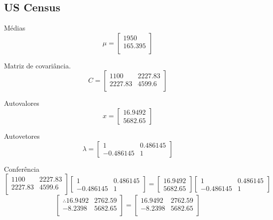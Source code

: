 \documentclass[a4paper, 11pt]{article}
\begin{document}
\subsection*{US Census}
Médias
$$ \mu =
\begin{bmatrix}
1950 \\
165.395\\
\end{bmatrix}
$$

Matriz de covariância.
$$ C =
\begin{bmatrix}
1100&2227.83\\
2227.83&4599.6\\
\end{bmatrix}
$$

Autovalores
$$ x =
\begin{bmatrix}
16.9492\\
5682.65
\end{bmatrix}
$$

Autovetores
$$ \lambda =
\begin{bmatrix}
1&0.486145\\
-0.486145&1
\end{bmatrix}
$$

Conferência
$$
\begin{bmatrix}
1100&2227.83\\
2227.83&4599.6\\
\end{bmatrix}
\begin{bmatrix}
1&0.486145\\
-0.486145&1
\end{bmatrix}
=
\begin{bmatrix}
16.9492\\
5682.65
\end{bmatrix}
\begin{bmatrix}
1&0.486145\\
-0.486145&1
\end{bmatrix}
$$
$$
\begin{bmatrix}
\therefore
16.9492&2762.59\\
-8.2398&5682.65\\
\end{bmatrix}
=
\begin{bmatrix}
16.9492&2762.59\\
-8.2398&5682.65\\
\end{bmatrix}
$$


\end{document}
